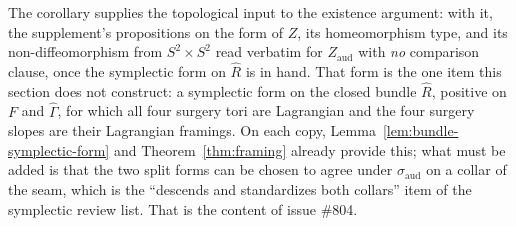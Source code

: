 \begin{remark}
The corollary supplies the topological input to the existence argument:
with it, the supplement's propositions on the form of $Z$, its
homeomorphism type, and its non-diffeomorphism from $S^2\times S^2$ read
verbatim for $Z_{\mathrm{aud}}$ with \emph{no} comparison clause, once
the symplectic form on $\hat R$ is in hand.  That form is the one item
this section does not construct: a symplectic form on the closed bundle
$\hat R$, positive on $F$ and $\hat\Gamma$, for which all four surgery
tori are Lagrangian and the four surgery slopes are their Lagrangian
framings.  On each copy, Lemma~\ref{lem:bundle-symplectic-form} and
Theorem~\ref{thm:framing} already provide this; what must be added
is that the two split forms can be chosen to agree under
$\sigma_{\mathrm{aud}}$ on a collar of the seam, which is the
``descends and standardizes both collars'' item of the symplectic review
list.  That is the content of issue \#804.
\end{remark}
